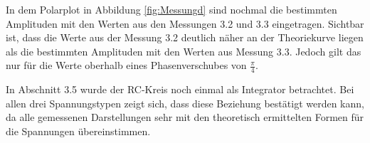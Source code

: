 In dem Polarplot in Abbildung \ref{fig:Messungd} sind nochmal die bestimmten Amplituden
mit den Werten aus den Messungen 3.2 und 3.3 eingetragen. Sichtbar ist, dass die
Werte aus der Messung 3.2 deutlich näher an der Theoriekurve liegen als die bestimmten
Amplituden mit den Werten aus Messung 3.3. Jedoch gilt das nur für die Werte
oberhalb eines Phasenverschubes von $\frac{\pi}{4}$.

In Abschnitt 3.5 wurde der RC-Kreis noch einmal als Integrator betrachtet. Bei allen
drei Spannungstypen zeigt sich, dass diese Beziehung bestätigt werden kann, da alle
gemessenen Darstellungen sehr mit den theoretisch ermittelten Formen für die
Spannungen übereinstimmen.
